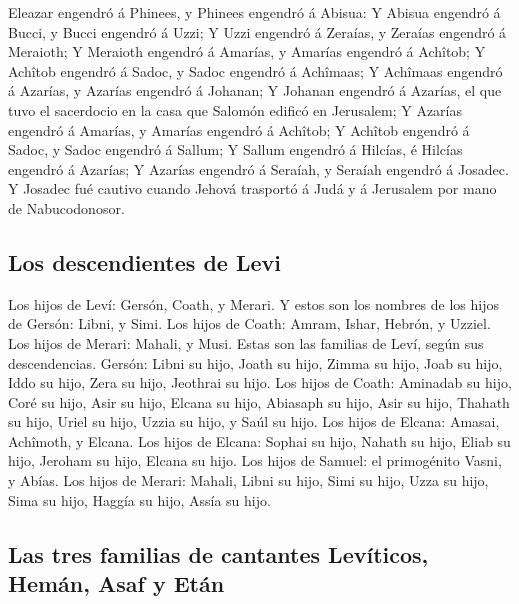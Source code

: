  Eleazar engendró á Phinees, y Phinees engendró á Abisua:
 Y Abisua engendró á Bucci, y Bucci engendró á Uzzi;
 Y Uzzi engendró á Zeraías, y Zeraías engendró á Meraioth;
 Y Meraioth engendró á Amarías, y Amarías engendró á
Achîtob;  Y Achîtob engendró á Sadoc, y Sadoc engendró á
Achîmaas;  Y Achîmaas engendró á Azarías, y Azarías
engendró á Johanan;  Y Johanan engendró á Azarías, el que
tuvo el sacerdocio en la casa que Salomón edificó en Jerusalem;
 Y Azarías engendró á Amarías, y Amarías engendró á
Achîtob;  Y Achîtob engendró á Sadoc, y Sadoc engendró á
Sallum;  Y Sallum engendró á Hilcías, é Hilcías engendró
á Azarías;  Y Azarías engendró á Seraíah, y Seraíah
engendró á Josadec.  Y Josadec fué cautivo cuando Jehová
trasportó á Judá y á Jerusalem por mano de Nabucodonosor.

\hypertarget{los-descendientes-de-levi}{%
\subsection{Los descendientes de Levi}\label{los-descendientes-de-levi}}

 Los hijos de Leví: Gersón, Coath, y Merari.
 Y estos son los nombres de los hijos de Gersón: Libni, y
Simi.  Los hijos de Coath: Amram, Ishar, Hebrón, y
Uzziel.  Los hijos de Merari: Mahali, y Musi. Estas son
las familias de Leví, según sus descendencias.  Gersón:
Libni su hijo, Joath su hijo, Zimma su hijo,  Joab su
hijo, Iddo su hijo, Zera su hijo, Jeothrai su hijo.  Los
hijos de Coath: Aminadab su hijo, Coré su hijo, Asir su hijo,
 Elcana su hijo, Abiasaph su hijo, Asir su hijo,
 Thahath su hijo, Uriel su hijo, Uzzia su hijo, y Saúl su
hijo.  Los hijos de Elcana: Amasai, Achîmoth, y Elcana.
 Los hijos de Elcana: Sophai su hijo, Nahath su hijo,
 Eliab su hijo, Jeroham su hijo, Elcana su hijo.
 Los hijos de Samuel: el primogénito Vasni, y Abías.
 Los hijos de Merari: Mahali, Libni su hijo, Simi su
hijo, Uzza su hijo,  Sima su hijo, Haggía su hijo, Assía
su hijo.

\hypertarget{las-tres-familias-de-cantantes-levuxedticos-hemuxe1n-asaf-y-etuxe1n}{%
\subsection{Las tres familias de cantantes Levíticos, Hemán, Asaf y
Etán}\label{las-tres-familias-de-cantantes-levuxedticos-hemuxe1n-asaf-y-etuxe1n}}

